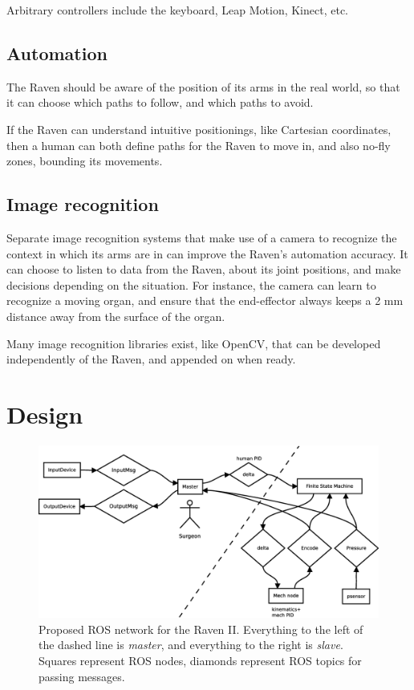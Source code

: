 \documentclass[letterpaper,twocolumn,10pt]{article}
\begin{document}
Arbitrary controllers include the keyboard, Leap Motion, Kinect, etc.

\subsection{Automation}
The Raven should be aware of the position of its arms in the real 
world, so that it can choose which paths to follow, and which paths 
to avoid.

If the Raven can understand intuitive positionings, like Cartesian 
coordinates, then a human can both define paths for the Raven to move 
in, and also no-fly zones, bounding its movements. 

\subsection{Image recognition}
Separate image recognition systems that make use of a camera to 
recognize the context in which its arms are in can improve the 
Raven's automation accuracy. It can choose to listen to data from 
the Raven, about its joint positions, and make decisions depending 
on the situation. For instance, the camera can learn to recognize 
a moving organ, and ensure that the end-effector always keeps a 
2 mm distance away from the surface of the organ.

Many image recognition libraries exist, like OpenCV, that can be 
developed independently of the Raven, and appended on when ready.

\section{Design}

\begin{figure}[ht!]
  \begin{center}
    \includegraphics[width=1.0\textwidth]{ros_high_level_v2.eps}
  \end{center}
  \caption{Proposed ROS network for the Raven II. Everything to the
    left of the dashed line is \emph{master}, and everything to the
    right is \emph{slave}. Squares represent ROS nodes, diamonds
    represent ROS topics for passing messages.}
  \label{fig:ros_network}
\end{figure}
\end{document}
